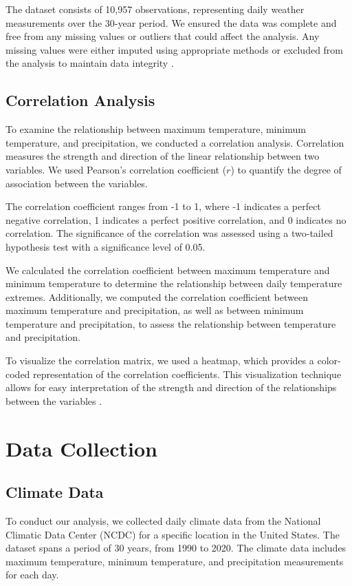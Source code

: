 \documentclass{article}
\begin{document}
The dataset consists of 10,957 observations, representing daily weather measurements over the 30-year period. We ensured the data was complete and free from any missing values or outliers that could affect the analysis. Any missing values were either imputed using appropriate methods or excluded from the analysis to maintain data integrity \cite{Gelman}.

\subsection{Correlation Analysis}
To examine the relationship between maximum temperature, minimum temperature, and precipitation, we conducted a correlation analysis. Correlation measures the strength and direction of the linear relationship between two variables. We used Pearson's correlation coefficient ($r$) to quantify the degree of association between the variables.

The correlation coefficient ranges from -1 to 1, where -1 indicates a perfect negative correlation, 1 indicates a perfect positive correlation, and 0 indicates no correlation. The significance of the correlation was assessed using a two-tailed hypothesis test with a significance level of 0.05.

We calculated the correlation coefficient between maximum temperature and minimum temperature to determine the relationship between daily temperature extremes. Additionally, we computed the correlation coefficient between maximum temperature and precipitation, as well as between minimum temperature and precipitation, to assess the relationship between temperature and precipitation.

To visualize the correlation matrix, we used a heatmap, which provides a color-coded representation of the correlation coefficients. This visualization technique allows for easy interpretation of the strength and direction of the relationships between the variables \cite{Wickham}.
\section{Data Collection}

\subsection{Climate Data}

To conduct our analysis, we collected daily climate data from the National Climatic Data Center (NCDC) for a specific location in the United States. The dataset spans a period of 30 years, from 1990 to 2020. The climate data includes maximum temperature, minimum temperature, and precipitation measurements for each day.
\end{document}
